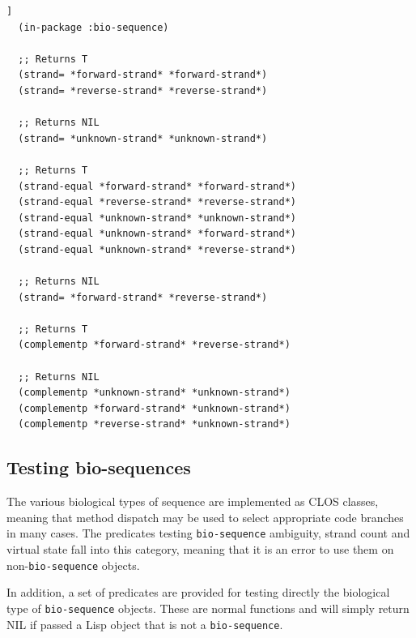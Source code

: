 \documentclass[a4paper, 12pt]{article}
\begin{document}
\begin{lstlisting}[caption={Sequence strand operations},
  label=lst:testing-bioseq,float=[tbph]]
  (in-package :bio-sequence)

  ;; Returns T
  (strand= *forward-strand* *forward-strand*)
  (strand= *reverse-strand* *reverse-strand*)

  ;; Returns NIL
  (strand= *unknown-strand* *unknown-strand*)
  
  ;; Returns T
  (strand-equal *forward-strand* *forward-strand*)
  (strand-equal *reverse-strand* *reverse-strand*)
  (strand-equal *unknown-strand* *unknown-strand*)
  (strand-equal *unknown-strand* *forward-strand*)
  (strand-equal *unknown-strand* *reverse-strand*)
  
  ;; Returns NIL
  (strand= *forward-strand* *reverse-strand*)
  
  ;; Returns T
  (complementp *forward-strand* *reverse-strand*)

  ;; Returns NIL
  (complementp *unknown-strand* *unknown-strand*)
  (complementp *forward-strand* *unknown-strand*)
  (complementp *reverse-strand* *unknown-strand*)
\end{lstlisting}


\subsection{Testing bio-sequences}

The various biological types of sequence are implemented as CLOS
classes, meaning that method dispatch may be used to select
appropriate code branches in many cases. The predicates testing
\lstinline!bio-sequence! ambiguity, strand count and virtual state
fall into this category, meaning that it is an error to use them on
non-\lstinline!bio-sequence! objects.

In addition, a set of predicates are provided for testing directly the
biological type of \lstinline!bio-sequence! objects. These are normal
functions and will simply return NIL if passed a Lisp object that is
not a \lstinline!bio-sequence!.
\end{document}
